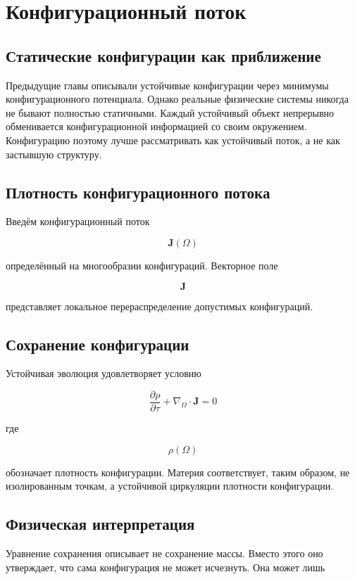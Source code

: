 \chapter{Конфигурационный поток}

\section{Статические конфигурации как приближение}

Предыдущие главы описывали устойчивые конфигурации через минимумы конфигурационного потенциала. Однако реальные физические системы никогда не бывают полностью статичными. Каждый устойчивый объект непрерывно обменивается конфигурационной информацией со своим окружением. Конфигурацию поэтому лучше рассматривать как устойчивый поток, а не как застывшую структуру.

\section{Плотность конфигурационного потока}

Введём конфигурационный поток

\[ \boxed{ \mathbf J(\Omega) } \]

определённый на многообразии конфигураций. Векторное поле

\[ \mathbf J \]

представляет локальное перераспределение допустимых конфигураций.

\section{Сохранение конфигурации}

Устойчивая эволюция удовлетворяет условию

\[ \boxed{ \frac{\partial\rho}{\partial\tau} + \nabla_\Omega\cdot\mathbf J = 0 } \]

где

\[ \rho(\Omega) \]

обозначает плотность конфигурации. Материя соответствует, таким образом, не изолированным точкам, а устойчивой циркуляции плотности конфигурации.

\section{Физическая интерпретация}

Уравнение сохранения описывает не сохранение массы. Вместо этого оно утверждает, что сама конфигурация не может исчезнуть. Она может лишь

